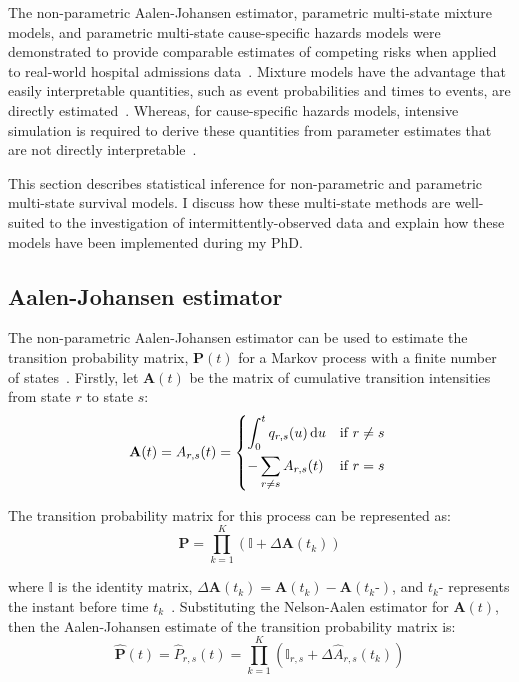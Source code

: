 The non-parametric Aalen-Johansen estimator, parametric multi-state mixture models, and parametric multi-state cause-specific hazards models were demonstrated to provide comparable estimates of competing risks when applied to real-world hospital admissions data~\parencite{Jackson2022-lt}. Mixture models have the advantage that easily interpretable quantities, such as event probabilities and times to events, are directly estimated~\parencite{Andersen2002-ps}. Whereas, for cause-specific hazards models, intensive simulation is required to derive these quantities from parameter estimates that are not directly interpretable~\parencite{Larson1985-ca}. %

This section describes statistical inference for non-parametric and parametric multi-state survival models. I discuss how these multi-state methods are well-suited to the investigation of intermittently-observed data and explain how these models have been implemented during my PhD.

\subsection{Aalen-Johansen estimator}

The non-parametric Aalen-Johansen estimator can be used to estimate the transition probability matrix, $\mathbf{P}(t)$ for a Markov process with a finite number of states~\parencite{Andersen1996-xs}. Firstly, let $\mathbf{A}(t)$ be the matrix of cumulative transition intensities from state $r$ to state $s$:
%
\[
    \mathbf{A}(t) = A_{r,s}(t) =
    \begin{dcases*}
        \int_{0}^{t}{q_{r,s}(u) \dif u} & if $r\neq s$ \\
        -\sum_{r \neq s}{A_{r,s}(t)}    & if $r = s$
    \end{dcases*}
\]

The transition probability matrix for this process can be represented as:
%
\[
    \mathbf{P} = \prod_{k = 1}^{K}{\left(\mathds{I}+\Delta\mathbf{A}(t_k)\right)}
\]

where $\mathds{I}$ is the identity matrix, $\Delta\mathbf{A}(t_k) = \mathbf{A}(t_k) - \mathbf{A}(t_k \mbox{-})$, and $t_k \mbox{-}$ represents the instant before time $t_k$~\parencite{Andersen1996-xs}. Substituting the Nelson-Aalen estimator for $\mathbf{A}(t)$, then the Aalen-Johansen estimate of the transition probability matrix is:
%
\[
    \mathbf{{\hat{P}}}(t) = \hat{P}_{r,s}(t) = \prod_{k = 1}^{K}{\left(\mathds{I}_{r,s}+\Delta\hat{A}_{r,s}(t_k)\right)}
\]

